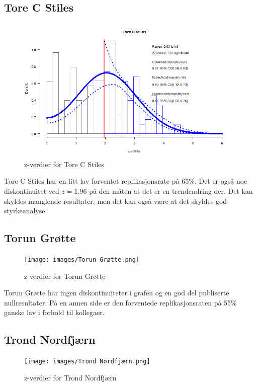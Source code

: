 \documentclass[doc,norsk]{apa7}
\begin{document}
\subsection{Tore C Stiles}
\begin{figure}[h!]
    \centering
    \includegraphics[width=\textwidth]{images/Tore C Stiles.png}
    \caption{z-verdier for Tore C Stiles}
\end{figure}

Tore C Stiles har en litt lav forventet replikasjonsrate på 65\%. Det er også noe diskontinuitet ved $z=1.96$ på den måten at det er en trendendring der. Det kan skyldes manglende resultater, men det kan også være at det skyldes god styrkeanalyse.

\subsection{Torun Grøtte}
\begin{figure}[h!]
    \centering
    \texttt{[image: images/Torun Grøtte.png]}
    \caption{z-verdier for Torun Grøtte}
\end{figure}

Torun Grøtte har ingen diskontinuiteter i grafen og en god del publiserte nullresultater. På en annen side er den forventede replikasjonsraten på 55\% ganske lav i forhold til kollegaer.

\subsection{Trond Nordfjærn}
\begin{figure}[h!]
    \centering
    \texttt{[image: images/Trond Nordfjærn.png]}
    \caption{z-verdier for Trond Nordfjærn}
\end{figure}
\end{document}
